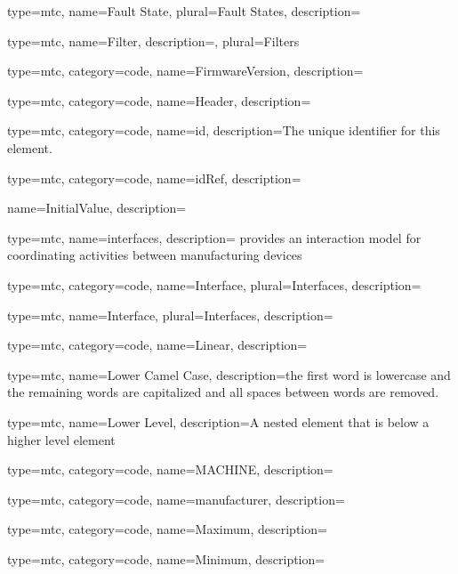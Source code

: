 {
  type=mtc,
  name={Fault State},
  plural={Fault States},
  description={}
}

{
  type=mtc,
  name={Filter},
  description={},
  plural={Filters}
}

{
  type=mtc,
  category=code,
  name={FirmwareVersion},
  description={}
}

{
  type=mtc,
  category=code,
  name={Header},
  description={}
}

{
  type=mtc,
  category=code,
  name={id},
  description={The unique identifier for this element.}
}

{
  type=mtc,
  category=code,
  name={idRef},
  description={}
}

{
  name={InitialValue},
  description={}
}

{
  type=mtc,
  name=interfaces,
  description={ provides an interaction model for coordinating activities between manufacturing devices}
}

{
  type=mtc,
  category=code,
  name={Interface},
  plural={Interfaces},
  description={}
}

{
  type=mtc,
  name={Interface},
  plural={Interfaces},
  description={}
}

{
  type=mtc,
  category=code,
  name={Linear},
  description={}
}

{
  type=mtc,
  name={Lower Camel Case},
  description={the first word is lowercase and the remaining words are capitalized and all spaces between words are removed.}
}

{
  type=mtc,
  name={Lower Level},
  description={A nested element that is below a higher level element}
}

{
  type=mtc,
  category=code,
  name={MACHINE},
  description={}
}

{
  type=mtc,
  category=code,
  name={manufacturer},
  description={}
}

{
  type=mtc,
  category=code,
  name={Maximum},
  description={}
}


{
  type=mtc,
  category=code,
  name={Minimum},
  description={}
}

